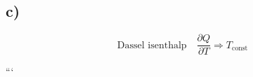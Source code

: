 

\subsection*{c)}
\[
\text{Dassel isenthalp} \quad \frac{\partial Q}{\partial T} \Rightarrow T_{\text{const}}
\]

```